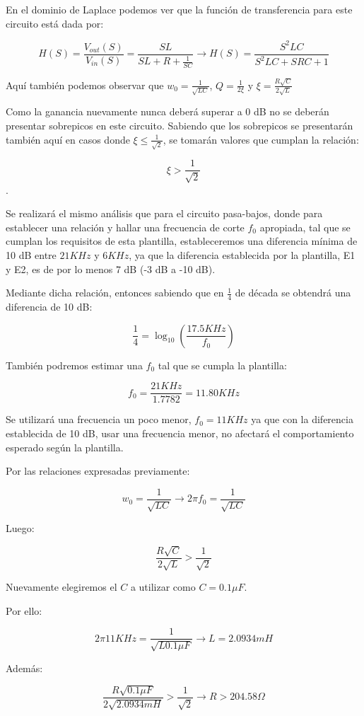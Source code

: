 En el dominio de Laplace podemos ver que la función de transferencia para este circuito está dada por:

$$H(S)=\frac{V_{out}(S)}{V_{in}(S)}=\frac{SL}{SL+R+\frac{1}{SC}} \longrightarrow H(S)=\frac{S^{2}LC}{S^2LC+SRC+1}$$

Aquí también podemos observar que $w_0=\frac{1}{\sqrt{LC}}$, $Q=\frac{1}{2\xi}$ y $\xi=\frac{R\sqrt{C}}{2\sqrt{L}}$

Como la ganancia nuevamente nunca deberá superar a 0 dB no se deberán presentar sobrepicos en este circuito.
Sabiendo que los sobrepicos se presentarán también aquí en casos donde $\xi \leq \frac{1}{\sqrt{2}}$, se tomarán valores que cumplan la relación:

$$\xi > \frac{1}{\sqrt{2}}$$.

Se realizará el mismo análisis que para el circuito pasa-bajos, donde para establecer una relación y hallar una frecuencia de corte $f_0$ apropiada, tal que se cumplan los requisitos
de esta plantilla, estableceremos una diferencia mínima de 10 dB entre $21 KHz$ y $6 KHz$, ya que la diferencia establecida por la plantilla, E1 y E2,
es de por lo menos 7 dB (-3 dB a -10 dB).

Mediante dicha relación, entonces sabiendo que en $\frac{1}{4}$ de década se obtendrá una diferencia de 10 dB:

$$\frac{1}{4}=\log_{10}(\frac{17.5KHz}{f_0})$$

También podremos estimar una $f_0$ tal que se cumpla la plantilla:

$$f_0 = \frac{21KHz}{1.7782} = 11.80 KHz$$

Se utilizará una frecuencia un poco menor, $f_0=11 KHz$ ya que con la diferencia establecida de 10 dB, usar una frecuencia menor, no afectará el comportamiento 
esperado según la plantilla.

Por las relaciones expresadas previamente:

$$w_0=\frac{1}{\sqrt{LC}} \longrightarrow 2\pi f_0=\frac{1}{\sqrt{LC}}$$

Luego:

$$\frac{R\sqrt{C}}{2\sqrt{L}} > \frac{1}{\sqrt{2}}$$

Nuevamente elegiremos el $C$ a utilizar como $C=0.1\mu F$. 

Por ello:

$$2\pi 11KHz=\frac{1}{\sqrt{L0.1 \mu F}} \longrightarrow L = 2.0934 mH$$

Además:

$$\frac{R\sqrt{0.1\mu F}}{2\sqrt{2.0934mH}} > \frac{1}{\sqrt{2}} \longrightarrow R > 204.58 \Omega $$

